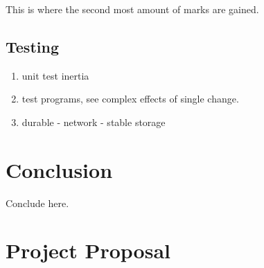 \documentclass[12pt,twoside,notitlepage]{report}
\begin{document}
This is where the second most amount of marks are gained.

\section{Testing}

\begin{enumerate}
	\item unit test inertia
	\item test programs, see complex effects of single change.
	\item durable - network - stable storage
\end{enumerate}



\cleardoublepage
\chapter{Conclusion}

Conclude here.




\cleardoublepage



\cleardoublepage

\appendix

\chapter{Project Proposal}


\end{document}
